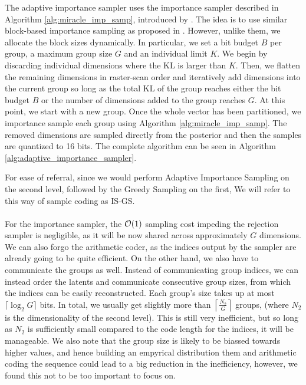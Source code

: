 The adaptive importance sampler uses the importance sampler described in
Algorithm \ref{alg:miracle_imp_samp}, introduced by \cite{havasi2018minimal}.
The idea is to use similar block-based importance sampling as proposed in
\cite{havasi2018minimal}. However, unlike them, we allocate the block sizes
dynamically. In particular, we set a bit budget $B$ per group, a maximum group
size $G$ and an individual limit $K$.
We begin by discarding individual dimensions where the KL is larger
than $K$. Then, we flatten the remaining dimensions in raster-scan order and 
iteratively add dimensions into the current group so long as the total KL of the
group reaches either the bit budget $B$ or the number of dimensions added to the
group reaches $G$. At this point, we start with a new group. Once the whole
vector has been partitioned, we importance sample each group using Algorithm 
\ref{alg:miracle_imp_samp}. The removed dimensions are sampled directly from
the posterior and then the samples are quantized to 16 bits. The complete
algorithm can be seen in Algorithm \ref{alg:adaptive_importance_sampler}.
\par
For ease of referral, since we would perform Adaptive Importance Sampling on the
second level, followed by the Greedy Sampling on the first, We will refer to
this way of sample coding as IS-GS.

\paragraph{}
For the importance sampler, the $\mathcal{O}(1)$ sampling cost impeding the rejection
sampler is negligible, as it will be now shared across approximately $G$
dimensions. We can also forgo the arithmetic coder, as the indices output by the
sampler are already going to be quite efficient. On the other hand, we also
have to communicate the groups as well. Instead of communicating
group indices, we can instead order the latents and communicate consecutive
group sizes, from which the indices can be easily reconstructed. Each
group's size takes up at most $\lceil \log_2G \rceil$ bits. In total, we usually
get slightly more than $\left\lceil \frac{N_2}{G} \right\rceil$ groups,
(where $N_2$ is the dimensionality of the second level). This is still
very inefficient, but so long as $N_2$ is sufficiently small compared to the
code length for the indices, it will be manageable. We also note that the group
size is likely to be biassed towards higher values, and hence building an
empyrical distribution them and arithmetic coding the sequence could lead to a
big reduction in the inefficiency, however, we found this not to be too
important to focus on. 

